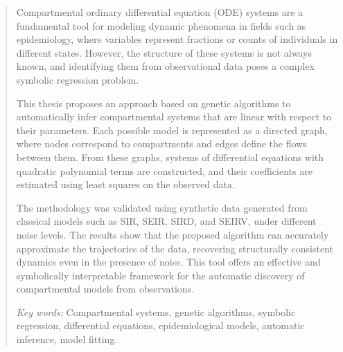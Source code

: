 \begin{abstract}

Compartmental ordinary differential equation (ODE) systems are a fundamental tool for modeling dynamic phenomena in fields such as epidemiology, where variables represent fractions or counts of individuals in different states. However, the structure of these systems is not always known, and identifying them from observational data poses a complex symbolic regression problem.

This thesis proposes an approach based on genetic algorithms to automatically infer compartmental systems that are linear with respect to their parameters. Each possible model is represented as a directed graph, where nodes correspond to compartments and edges define the flows between them. From these graphs, systems of differential equations with quadratic polynomial terms are constructed, and their coefficients are estimated using least squares on the observed data.

The methodology was validated using synthetic data generated from classical models such as SIR, SEIR, SIRD, and SEIRV, under different noise levels. The results show that the proposed algorithm can accurately approximate the trajectories of the data, recovering structurally consistent dynamics even in the presence of noise. This tool offers an effective and symbolically interpretable framework for the automatic discovery of compartmental models from observations.

\textit{Key words:} Compartmental systems, genetic algorithms, symbolic regression, differential equations, epidemiological models, automatic inference, model fitting.


\end{abstract}